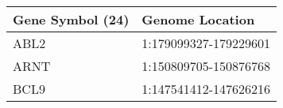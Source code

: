 \begin{tabular}{ll}
\toprule
Gene Symbol (24) &       Genome Location \\
\midrule
            ABL2 & 1:179099327-179229601 \\
            ARNT & 1:150809705-150876768 \\
            BCL9 & 1:147541412-147626216 \\
\bottomrule
\end{tabular}
